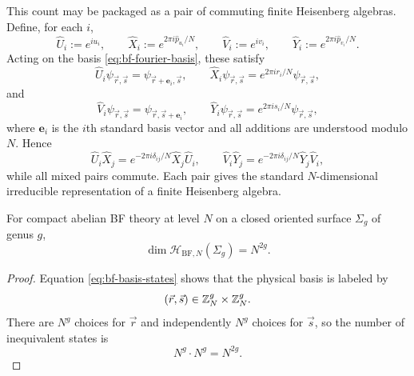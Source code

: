 \noindent This count may be packaged as a pair of commuting finite Heisenberg algebras. Define, for each $i$,
\begin{equation}\label{eq:bf-heisenberg-ops}
\hat U_i:=e^{iu_i},
\qquad
\hat X_i:=e^{2\pi i \hat p_{u_i}/N},
\qquad
\hat V_i:=e^{iv_i},
\qquad
\hat Y_i:=e^{2\pi i \hat p_{v_i}/N}.
\end{equation}
Acting on the basis \eqref{eq:bf-fourier-basis}, these satisfy
\begin{equation*}
\hat U_i\psi_{\vec r,\vec s}=\psi_{\vec r+\mathbf e_i,\vec s},
\qquad
\hat X_i\psi_{\vec r,\vec s}=e^{2\pi i r_i/N}\psi_{\vec r,\vec s},
\end{equation*}
and
\begin{equation*}
\hat V_i\psi_{\vec r,\vec s}=\psi_{\vec r,\vec s+\mathbf e_i},
\qquad
\hat Y_i\psi_{\vec r,\vec s}=e^{2\pi i s_i/N}\psi_{\vec r,\vec s},
\end{equation*}
where $\mathbf e_i$ is the $i$th standard basis vector and all additions are understood modulo $N$. Hence
\begin{equation}\label{eq:bf-heisenberg-relations}
\hat U_i\hat X_j=e^{-2\pi i\delta_{ij}/N}\hat X_j\hat U_i,
\qquad
\hat V_i\hat Y_j=e^{-2\pi i\delta_{ij}/N}\hat Y_j\hat V_i,
\end{equation}
while all mixed pairs commute. Each pair gives the standard $N$-dimensional irreducible representation of a finite Heisenberg algebra.

\begin{proposition}\label{prop:bf-gsd}
For compact abelian BF theory at level $N$ on a closed oriented surface $\Sigma_g$ of genus $g$,
\begin{equation}\label{eq:bf-gsd}
\dim \mathcal{H}_{\mathrm{BF},N}(\Sigma_g)=N^{2g}.
\end{equation}
\end{proposition}

\begin{proof}
Equation \eqref{eq:bf-basis-states} shows that the physical basis is labeled by
\begin{equation*}
(\vec r,\vec s)\in \mathbb{Z}_N^g\times \mathbb{Z}_N^g.
\end{equation*}
There are $N^g$ choices for $\vec r$ and independently $N^g$ choices for $\vec s$, so the number of inequivalent states is
\begin{equation*}
N^g\cdot N^g=N^{2g}.
\end{equation*}
\end{proof}

